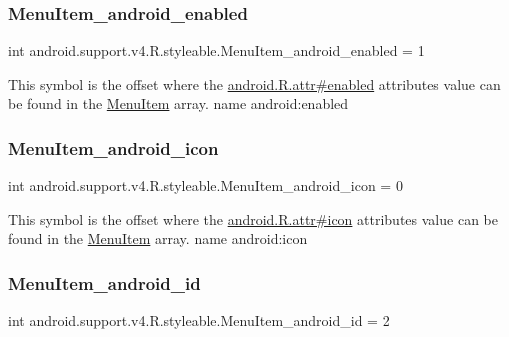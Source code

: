 \subsubsection{\texorpdfstring{Menu\+Item\+\_\+android\+\_\+enabled}{MenuItem\_android\_enabled}}
{\footnotesize\ttfamily int android.\+support.\+v4.\+R.\+styleable.\+Menu\+Item\+\_\+android\+\_\+enabled = 1\hspace{0.3cm}{\ttfamily [static]}}

This symbol is the offset where the \hyperlink{}{android.\+R.\+attr\#enabled} attribute\textquotesingle{}s value can be found in the \hyperlink{classandroid_1_1support_1_1v4_1_1R_1_1styleable_a4234e016636b99c0c3d9cfc512903697}{Menu\+Item} array.  name android\+:enabled \mbox{\label{classandroid_1_1support_1_1v4_1_1R_1_1styleable_a3e063bea4cd93ef6a4f2e77cf1d904d4}} 
\subsubsection{\texorpdfstring{Menu\+Item\+\_\+android\+\_\+icon}{MenuItem\_android\_icon}}
{\footnotesize\ttfamily int android.\+support.\+v4.\+R.\+styleable.\+Menu\+Item\+\_\+android\+\_\+icon = 0\hspace{0.3cm}{\ttfamily [static]}}

This symbol is the offset where the \hyperlink{}{android.\+R.\+attr\#icon} attribute\textquotesingle{}s value can be found in the \hyperlink{classandroid_1_1support_1_1v4_1_1R_1_1styleable_a4234e016636b99c0c3d9cfc512903697}{Menu\+Item} array.  name android\+:icon \mbox{\label{classandroid_1_1support_1_1v4_1_1R_1_1styleable_a2fb5698551ba92fc84a909e0e0707a7b}} 
\subsubsection{\texorpdfstring{Menu\+Item\+\_\+android\+\_\+id}{MenuItem\_android\_id}}
{\footnotesize\ttfamily int android.\+support.\+v4.\+R.\+styleable.\+Menu\+Item\+\_\+android\+\_\+id = 2\hspace{0.3cm}{\ttfamily [static]}}


